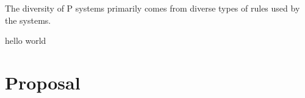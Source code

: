 \documentclass[12pt,A4]{article}
\begin{document}
The diversity of P systems primarily comes from diverse types of rules used by the systems.

\cite{freund-2007-ff-stat}
\cite{freund-2013-ff-dyn}
\cite{verlan-2014-ff-use}
\cite{verlan-2020-ff-snp}

hello world


\section{Proposal}






\end{document}
